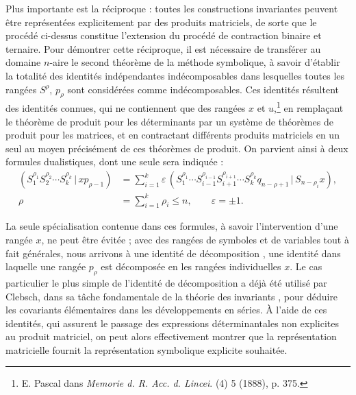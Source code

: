 \documentclass[11pt]{article}
\newcommand{\pair}[2]{(#1\,|\,#2)}
\newcommand{\eps}{\varepsilon}
\begin{document}
Plus importante est la réciproque : toutes les constructions invariantes peuvent être représentées explicitement par des produits matriciels, de sorte que le procédé ci-dessus constitue l'extension du procédé de contraction binaire et ternaire. Pour démontrer cette réciproque, il est nécessaire de transférer au domaine $n$-aire le second théorème de la méthode symbolique, à savoir d'établir la totalité des identités indépendantes indécomposables dans lesquelles toutes les rangées $S^\rho$, $p_\rho$ sont considérées comme indécomposables. Ces identités résultent des identités connues, qui ne contiennent que des rangées $x$ et $u$,\footnote{E. Pascal dans \emph{Memorie d. R. Acc. d. Lincei}. (4) 5 (1888), p. 375.} en remplaçant le théorème de produit pour les déterminants par un système de théorèmes de produit pour les matrices, et en contractant différents produits matriciels en un seul au moyen précisément de ces théorèmes de produit. On parvient ainsi à deux formules dualistiques, dont une seule sera indiquée :
\begin{equation}
\begin{aligned}
 \pair{S_1^{\rho_1}S_2^{\rho_2}\cdots S_k^{\rho_k}}{x p_{\rho-1}}
 &=\sum_{i=1}^{k}\eps\,\pair{S_1^{\rho_1}\cdots S_{i-1}^{\rho_{i-1}}S_{i+1}^{\rho_{i+1}}\cdots S_k^{\rho_k}q_{n-\rho+1}}{S_{n-\rho_i}x},\\
 \rho&=\sum_{i=1}^{k}\rho_i\le n,\qquad \eps=\pm1.
\end{aligned}
\tag{2}
\end{equation}

La seule spécialisation contenue dans ces formules, à savoir l'intervention d'une rangée $x$, ne peut être évitée ; avec des rangées de symboles et de variables tout à fait générales, nous arrivons à une \og{} identité de décomposition \fg{}, une identité dans laquelle une rangée $p_\rho$ est décomposée en les rangées individuelles $x$. Le cas particulier le plus simple de l'identité de décomposition a déjà été utilisé par Clebsch, dans sa \og{} tâche fondamentale de la théorie des invariants \fg{}, pour déduire les covariants élémentaires dans les développements en séries. À l'aide de ces identités, qui assurent le passage des expressions déterminantales non explicites au produit matriciel, on peut alors effectivement montrer que la représentation matricielle fournit la représentation symbolique explicite souhaitée.
\end{document}
